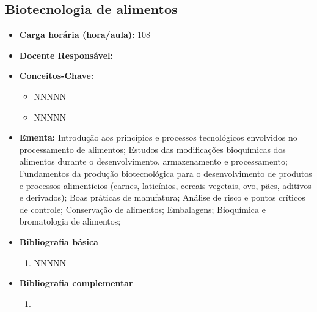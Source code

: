 \documentclass[11pt,fleqn]{book} %
\begin{document}
\subsection{Biotecnologia de alimentos}\label{disc:biotecAlimentos}
\begin{itemize}
	\item \textbf{Carga horária (hora/aula):} 108
	\item \textbf{Docente Responsável:}
	\item \textbf{Conceitos-Chave:}
	\begin{itemize}
		\item NNNNN
		\item NNNNN
	\end{itemize}
	\item \textbf{Ementa:} 
	Introdução aos princípios e processos tecnológicos envolvidos no processamento de alimentos;
	Estudos das modificações bioquímicas dos alimentos durante o desenvolvimento, armazenamento e processamento;
	Fundamentos da produção biotecnológica para o desenvolvimento de produtos e processos alimentícios (carnes, laticínios, cereais vegetais, ovo, pães, aditivos e derivados);
	Boas práticas de manufatura;
	Análise de risco e pontos críticos de controle;
	Conservação de alimentos;
	Embalagens;
	Bioquímica e bromatologia de alimentos;
	\item \textbf{Bibliografia básica}
	\begin{enumerate}
		\item NNNNN
	\end{enumerate}
	\item \textbf{Bibliografia complementar}
	\begin{enumerate}
		\item 
	\end{enumerate}	
\end{itemize}


\newpage
\end{document}
